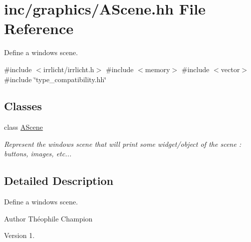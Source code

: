 \hypertarget{AScene_8hh}{}\section{inc/graphics/\+A\+Scene.hh File Reference}
\label{AScene_8hh}


Define a window\textquotesingle{}s scene.  


{\ttfamily \#include $<$irrlicht/irrlicht.\+h$>$}\newline
{\ttfamily \#include $<$memory$>$}\newline
{\ttfamily \#include $<$vector$>$}\newline
{\ttfamily \#include \char`\"{}type\+\_\+compatibility.\+hh\char`\"{}}\newline
\subsection*{Classes}
\begin{DoxyCompactItemize}
\item 
class \hyperlink{classAScene}{A\+Scene}
\begin{DoxyCompactList}\small\item\em Represent the window\textquotesingle{}s scene that will print some widget/object of the scene \+: buttons, images, etc... \end{DoxyCompactList}\end{DoxyCompactItemize}


\subsection{Detailed Description}
Define a window\textquotesingle{}s scene. 

\begin{DoxyAuthor}{Author}
Théophile Champion 
\end{DoxyAuthor}
\begin{DoxyVersion}{Version}
1. 
\end{DoxyVersion}
